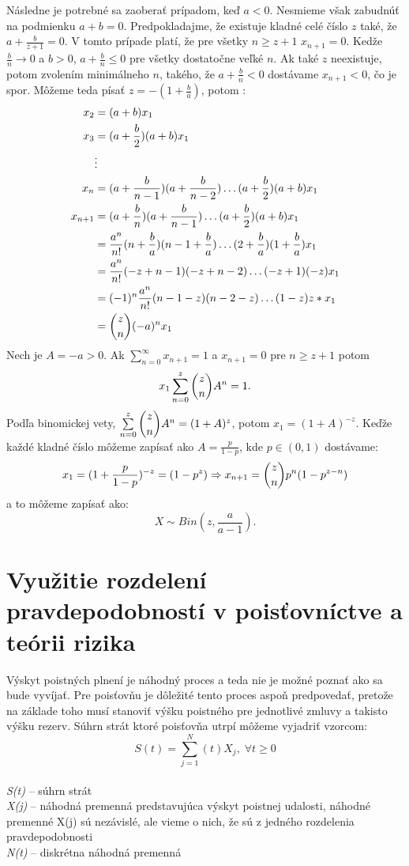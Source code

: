 \documentclass[a4paper,10pt]{article}
\theoremstyle{plain}
\theoremstyle{definition}
\begin{document}
Následne je potrebné sa zaoberať prípadom, keď $ a<0 $. Nesmieme však zabudnúť na podmienku $ a+b=0 $.
Predpokladajme, že existuje kladné celé číslo $ z $ také, že $ a + \frac{b}{z+1} = 0 $. V tomto prípade
platí, že pre všetky $ n\geq z+1  $ $ x_{n+1} = 0 $.
Kedže $ \frac{b}{n} \rightarrow 0$ a $ b>0 $, $a + \frac{b}{n} \leq 0$ pre všetky dostatočne veľké $ n $. Ak také $ z $ neexistuje, potom zvolením minimálneho $ n $, takého, že $ a + \frac{b}{n} < 0 $ dostávame $ x_{n+1}<0 $, čo je spor.
Môžeme teda písať $ z = -(1+\frac{b}{a}) $, potom :
\begin{align*}
x_{2}&=(a+b)\*x_{1} \\
x_{3}&=(a + \frac{b}{2}) \* (a + b)\*x_{1}\\
&\vdots \\
x_{n} &= (a+\frac{b}{n-1})\*(a+\frac{b}{n-2})\ldots  (a + \frac{b}{2})\*(a+b)\*x_{1}\\
x_{n+1} &= (a + \frac{b}{n})\*(a + \frac{b}{n-1})\ldots (a + \frac{b}{2})\*(a+b)\*x_{1}\\
&= \frac{a^{n}}{n!}\*(n + \frac{b}{a})\*(n-1+\frac{b}{a}) \ldots (2+\frac{b}{a})\*(1+\frac{b}{a})\*x_{1} \\
&= \frac{a^{n}}{n!}\*(-z+n-1)\*(-z+n-2) \ldots (-z+1)\*(-z)\*x_{1} \\
&= (-1)^{n}\*\frac{a^{n}}{n!}\*(n-1-z)\*(n-2-z)\ldots(1-z)\*z*x_{1} \\
&= \dbinom{z}{n}\*(-a)^{n}\*x_{1}  \\
\end{align*}
\noindent Nech je $ A = -a >0 $. Ak $ \sum\limits_{n=0}^\infty x_{n+1} = 1 $ a $ x_{n+1} = 0 $ pre $ n\geq z+1 $ potom 
$$ x_{1} \sum\limits_{n=0}^z \dbinom{z}{n} A^{n}= 1 \text{.}$$
\noindent Podľa binomickej vety, $ \sum\limits_{n=0}^z \dbinom{z}{n} A^{n}= (1+A)^{z} $, potom $ x_{1} = (1+A)^{-z} $.
Keďže každé kladné číslo môžeme zapísať ako $ A = \frac{p}{1-p} $, kde $ p \in (0,1) $ dostávame: 
$$ x_{1} = (1 + \frac{p}{1-p})^{-z} = (1-p^{z}) \Rightarrow x_{n+1} = \dbinom{z}{n}\*p^{n}\*(1-p^{z-n}) $$ a to 
môžeme zapísať ako: $$ X \sim Bin(z,\frac{a}{a-1}) \text{.}$$%
\newpage %
\section{Využitie rozdelení pravdepodobností v poisťovníctve a teórii rizika} %
Výskyt poistných plnení je náhodný proces a teda nie je možné poznať ako sa bude vyvíjať. Pre poisťovňu je dôležité tento proces aspoň predpovedať, pretože na základe toho musí stanoviť výšku poistného pre jednotlivé zmluvy a takisto výšku rezerv. 
Súhrn strát ktoré poisťovňa utrpí môžeme vyjadriť vzorcom:
$$ S(t) = \sum\limits_{j=1}^N(t) X_{j},\; \forall t\geq0 $$\\
\textit{S(t)} – súhrn strát \\
\textit{X(j)} – náhodná premenná predstavujúca výskyt poistnej udalosti, náhodné premenné X(j) sú nezávislé, ale vieme o nich, že sú  z jedného rozdelenia pravdepodobnosti\\
\textit{N(t)} – diskrétna náhodná premenná\\
\end{document}
